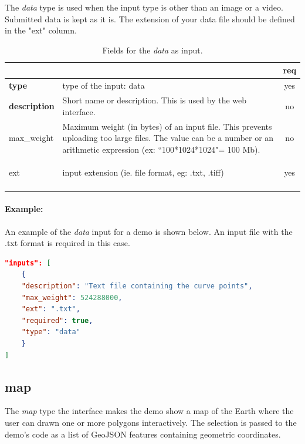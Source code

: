 The \emph{data} type is used when the input type is other than an image or a video. Submitted data is kept as it is. The extension of your data file should be defined in the "ext" column. 
\begin{longtable}{|>{\bf}L{\linewidth}|L{\linewidth}|c|}
\hline
{}     &  & {\bf req} \tabularnewline 
\hline \hline
 type         & type of the input: data & yes \\ \hline
 description  & Short name or description. This is used by the web interface. & no \\ \hline

 max\_weight   & Maximum weight (in bytes) of an input file. This prevents uploading too large files. The value can be a number or an arithmetic expression (ex: ``100*1024*1024"= 100 Mb). & no \\ \hline

 ext          & input extension (ie. file format, eg: .txt, .tiff) & yes \\ \hline

\caption{Fields for the \emph{data} as input.}
\end{longtable}

\paragraph{Example:}
An example of the \emph{data} input for a demo is shown below. An input file with the .txt format is required in this case.
\begin{lstlisting}[language=json,firstnumber=1]
"inputs": [
    {
    "description": "Text file containing the curve points",
    "max_weight": 524288000,
    "ext": ".txt",
    "required": true,
    "type": "data"
    }
]
\end{lstlisting}

\subsection{map}
The \emph{map} type the interface makes the demo show a map of the Earth where the user can drawn one or more polygons interactively. The selection is passed to the demo's code as a list of GeoJSON features containing geometric coordinates.

